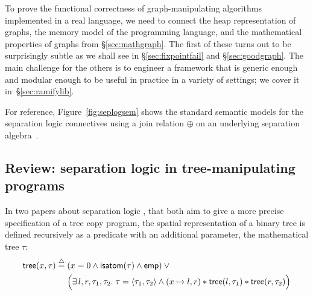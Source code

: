 

To prove the functional correctness of graph-manipulating algorithms implemented in a real language, we need to connect the heap representation of graphs, the memory model of the programming language, and the mathematical properties of graphs from \S\ref{sec:mathgraph}.  The first of these turns out to be surprisingly subtle as we shall see in \S\ref{sec:fixpointfail} and \S\ref{sec:goodgraph}.  The main challenge for the others is to engineer a framework that is generic enough and modular enough to be useful in practice in a variety of settings; we cover it in~\S\ref{sec:ramifylib}.



For reference, Figure~\ref{fig:seplogsem} shows the standard semantic models for the separation logic connectives using a join relation $\oplus$ on an underlying separation algebra~\cite{dockins09}.

\subsection{\color{red} Review: separation logic in tree-manipulating programs}

In two papers about separation
logic \citep{o2001local, o2012primer}, that both aim to give a more
precise specification of a tree copy program, the spatial
representation of a binary tree is defined recursively as a predicate
with an additional parameter, the mathematical tree $\tau$:
\begin{equation}\label{def:tree}
\begin{split}
    \mathsf{tree}(x, \tau)\;\defeq\;
    &(x=0 \wedge \mathsf{isatom}(\tau) \wedge \mathsf{emp})
    \vee \null \\ &\Big(\exists\,l,r,\tau_1,\tau_2.\; \tau=\langle \tau_1,
    \tau_2 \rangle \wedge (x \mapsto l,r) \scon
    \mathsf{tree}(l, \tau_1) \scon \mathsf{tree}(r, \tau_2)\Big)
    \end{split}
\end{equation}

